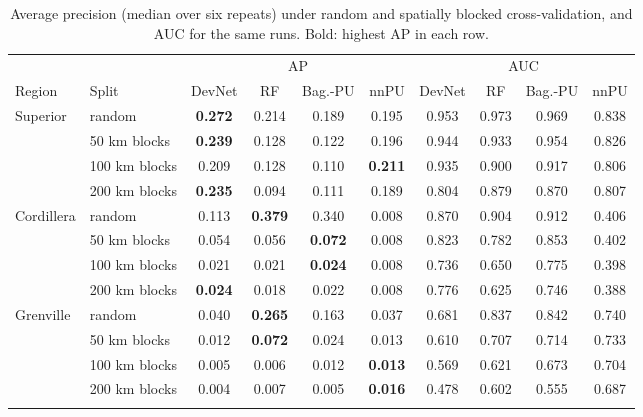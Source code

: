 \documentclass[pdflatex,sn-apa]{sn-jnl}
\begin{document}
\begin{table}[t]
\caption{Average precision (median over six repeats) under random and spatially blocked cross-validation, and AUC for the same runs. Bold: highest AP in each row.}\label{tab:spatial}
\scriptsize
\setlength{\tabcolsep}{2.5pt}
\begin{tabular*}{\textwidth}{@{\extracolsep\fill}llcccccccc}
\toprule
 & & \multicolumn{4}{c}{AP} & \multicolumn{4}{c}{AUC} \\
\cmidrule(lr){3-6}\cmidrule(lr){7-10}
Region & Split & DevNet & RF & Bag.-PU & nnPU & DevNet & RF & Bag.-PU & nnPU \\
\midrule
\multirow{4}{*}{Superior} & random & \textbf{0.272} & 0.214 & 0.189 & 0.195 & 0.953 & 0.973 & 0.969 & 0.838 \\
 & 50 km blocks & \textbf{0.239} & 0.128 & 0.122 & 0.196 & 0.944 & 0.933 & 0.954 & 0.826 \\
 & 100 km blocks & 0.209 & 0.128 & 0.110 & \textbf{0.211} & 0.935 & 0.900 & 0.917 & 0.806 \\
 & 200 km blocks & \textbf{0.235} & 0.094 & 0.111 & 0.189 & 0.804 & 0.879 & 0.870 & 0.807 \\
\midrule
\multirow{4}{*}{Cordillera} & random & 0.113 & \textbf{0.379} & 0.340 & 0.008 & 0.870 & 0.904 & 0.912 & 0.406 \\
 & 50 km blocks & 0.054 & 0.056 & \textbf{0.072} & 0.008 & 0.823 & 0.782 & 0.853 & 0.402 \\
 & 100 km blocks & 0.021 & 0.021 & \textbf{0.024} & 0.008 & 0.736 & 0.650 & 0.775 & 0.398 \\
 & 200 km blocks & \textbf{0.024} & 0.018 & 0.022 & 0.008 & 0.776 & 0.625 & 0.746 & 0.388 \\
\midrule
\multirow{4}{*}{Grenville} & random & 0.040 & \textbf{0.265} & 0.163 & 0.037 & 0.681 & 0.837 & 0.842 & 0.740 \\
 & 50 km blocks & 0.012 & \textbf{0.072} & 0.024 & 0.013 & 0.610 & 0.707 & 0.714 & 0.733 \\
 & 100 km blocks & 0.005 & 0.006 & 0.012 & \textbf{0.013} & 0.569 & 0.621 & 0.673 & 0.704 \\
 & 200 km blocks & 0.004 & 0.007 & 0.005 & \textbf{0.016} & 0.478 & 0.602 & 0.555 & 0.687 \\
\botrule
\end{tabular*}
\end{table}
\end{document}
